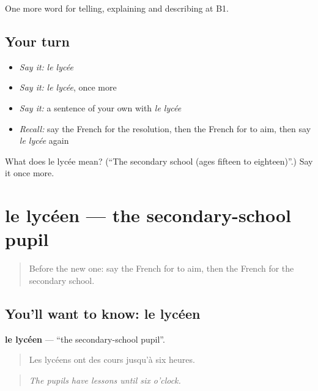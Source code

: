 \begin{grammarlens}[title={What you've built}]
One more word for telling, explaining and describing at B1.
\end{grammarlens}

\subsection*{Your turn}
\begin{itemize}
\raggedright
  \item \emph{Say it:} \emph{le lycée}
  \item \emph{Say it:} \emph{le lycée}, once more
  \item \emph{Say it:} a sentence of your own with \emph{le lycée}
  \item \emph{Recall:} say the French for the resolution, then the French for to aim, then say \emph{le lycée} again
\end{itemize}

\begin{tcolorbox}[breakable,colback=teal!4,colframe=teal!35!black,title={Before you move on}]
What does le lycée mean? (\textquotedblleft{}The secondary school (ages fifteen to eighteen)\textquotedblright{}.) Say it once more.
\end{tcolorbox}
\section[le lycéen]{le lycéen — the secondary-school pupil}

\label{lesson:FR-C375-lyceen}



\begin{quote}
Before the new one: say the French for to aim, then the French for the secondary school.
\end{quote}

\subsection*{You'll want to know: le lycéen}
\textbf{le lycéen} — \textquotedblleft{}the secondary-school pupil\textquotedblright{}.

\begin{quote}
Les lycéens ont des cours jusqu'à six heures.
\end{quote}

\begin{quote}
\emph{The pupils have lessons until six o'clock.}
\end{quote}

